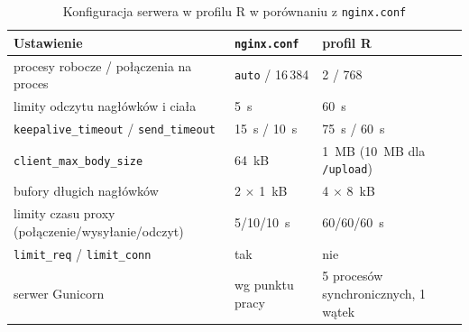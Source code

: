 \documentclass[a4paper,12pt]{article}
\begin{document}
\begin{table}[H]
\centering
\small
\caption{Konfiguracja serwera w profilu R w porównaniu z \texttt{nginx.conf}}\label{tab:profil_r}
\begin{tabularx}{\linewidth}{@{}L{6.4cm}L{3.4cm}Y@{}}
\toprule
Ustawienie & \texttt{nginx.conf} & profil R \\
\midrule
procesy robocze / połączenia na proces & \texttt{auto} / 16\,384 & 2 / 768 \\
limity odczytu nagłówków i ciała & 5~s & 60~s \\
\texttt{keepalive\_timeout} / \texttt{send\_timeout} & 15~s / 10~s & 75~s / 60~s \\
\texttt{client\_max\_body\_size} & 64~kB & 1~MB (10~MB dla \texttt{/upload}) \\
bufory długich nagłówków & 2 $\times$ 1~kB & 4 $\times$ 8~kB \\
limity czasu proxy (połączenie/wysyłanie/odczyt) & 5/10/10~s & 60/60/60~s \\
\texttt{limit\_req} / \texttt{limit\_conn} & tak & nie \\
serwer Gunicorn & wg punktu pracy & 5 procesów synchronicznych, 1 wątek \\
\bottomrule
\end{tabularx}
\end{table}
\end{document}
